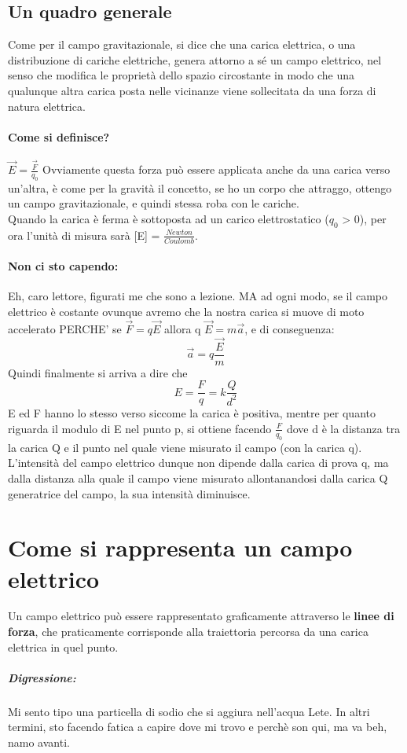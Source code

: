 \documentclass[12pt, a4paper, openany, oneside]{book}
\begin{document}
\subsection{Un quadro generale}
Come per il campo gravitazionale, si dice che una carica elettrica, o una 
distribuzione di cariche elettriche, genera attorno a sé un campo elettrico, nel
senso che modifica le proprietà dello spazio circostante in modo che una 
qualunque altra carica posta nelle vicinanze viene sollecitata da una forza di 
natura elettrica. 
\paragraph{Come si definisce?} $\overrightarrow{E} = \frac{\overrightarrow{F}}{q_{0}}$
Ovviamente questa forza può essere applicata anche da una carica verso un'altra,
è come per la gravità il concetto, se ho un corpo che attraggo, ottengo un 
campo gravitazionale, e quindi stessa roba con le cariche.
\\
Quando la carica è ferma è sottoposta ad un carico elettrostatico ($q_{0}$ > 0),
per ora l'unità di misura sarà [E] = $\frac{Newton}{Coulomb}$.
\paragraph{Non ci sto capendo: }Eh, caro lettore, figurati me che sono a lezione.
MA ad ogni modo, se il campo elettrico è costante ovunque avremo che la nostra
carica si muove di moto accelerato PERCHE' se $\overrightarrow{F} = q \overrightarrow{E}$ 
allora q $\overrightarrow{E} = m \overrightarrow{a}$, e di conseguenza:
\[
\overrightarrow{a} = q \frac{\overrightarrow{E}}{m}
\]	
Quindi finalmente si arriva a dire che 
\[
E = \frac{F}{q} = k \frac{Q}{d^{2}}
\]
E ed F hanno lo stesso verso siccome la carica è positiva, mentre per quanto
riguarda il modulo di E nel punto p, si ottiene facendo $\frac{F}{q_{0}}$
dove d è la distanza tra la carica Q e il punto nel quale viene misurato il 
campo (con la carica q). L'intensità del campo elettrico dunque non dipende 
dalla carica di prova q, ma dalla distanza alla quale il campo viene misurato 
allontanandosi dalla carica Q generatrice del campo, la sua 
intensità diminuisce. 
\section{Come si rappresenta un campo elettrico}
Un campo elettrico può essere rappresentato graficamente attraverso le \textbf{linee di 
forza}, che praticamente corrisponde alla traiettoria percorsa da una carica 
elettrica in quel punto.
\subparagraph{Digressione:} Mi sento tipo una particella di sodio che si aggiura 
nell'acqua Lete. In altri termini, sto facendo fatica a capire dove mi trovo e 
perchè son qui, ma va beh, namo avanti.
\end{document}
